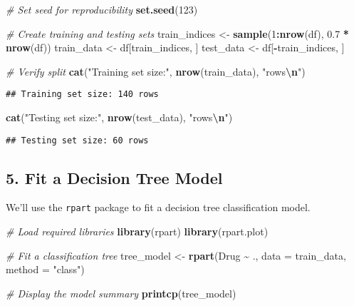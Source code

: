 \documentclass[
]{article}
\newenvironment{Shaded}{\begin{snugshade}}{\end{snugshade}}
\newcommand{\AttributeTok}[1]{\textcolor[rgb]{0.13,0.29,0.53}{#1}}
\newcommand{\CommentTok}[1]{\textcolor[rgb]{0.56,0.35,0.01}{\textit{#1}}}
\newcommand{\DecValTok}[1]{\textcolor[rgb]{0.00,0.00,0.81}{#1}}
\newcommand{\FloatTok}[1]{\textcolor[rgb]{0.00,0.00,0.81}{#1}}
\newcommand{\FunctionTok}[1]{\textcolor[rgb]{0.13,0.29,0.53}{\textbf{#1}}}
\newcommand{\NormalTok}[1]{#1}
\newcommand{\OtherTok}[1]{\textcolor[rgb]{0.56,0.35,0.01}{#1}}
\newcommand{\SpecialCharTok}[1]{\textcolor[rgb]{0.81,0.36,0.00}{\textbf{#1}}}
\newcommand{\StringTok}[1]{\textcolor[rgb]{0.31,0.60,0.02}{#1}}
\begin{document}
\begin{Shaded}
\begin{Highlighting}[]
\CommentTok{\# Set seed for reproducibility}
\FunctionTok{set.seed}\NormalTok{(}\DecValTok{123}\NormalTok{)}

\CommentTok{\# Create training and testing sets}
\NormalTok{train\_indices }\OtherTok{\textless{}{-}} \FunctionTok{sample}\NormalTok{(}\DecValTok{1}\SpecialCharTok{:}\FunctionTok{nrow}\NormalTok{(df), }\FloatTok{0.7} \SpecialCharTok{*} \FunctionTok{nrow}\NormalTok{(df))}
\NormalTok{train\_data }\OtherTok{\textless{}{-}}\NormalTok{ df[train\_indices, ]}
\NormalTok{test\_data }\OtherTok{\textless{}{-}}\NormalTok{ df[}\SpecialCharTok{{-}}\NormalTok{train\_indices, ]}

\CommentTok{\# Verify split}
\FunctionTok{cat}\NormalTok{(}\StringTok{"Training set size:"}\NormalTok{, }\FunctionTok{nrow}\NormalTok{(train\_data), }\StringTok{"rows}\SpecialCharTok{\textbackslash{}n}\StringTok{"}\NormalTok{)}
\end{Highlighting}
\end{Shaded}

\begin{verbatim}
## Training set size: 140 rows
\end{verbatim}

\begin{Shaded}
\begin{Highlighting}[]
\FunctionTok{cat}\NormalTok{(}\StringTok{"Testing set size:"}\NormalTok{, }\FunctionTok{nrow}\NormalTok{(test\_data), }\StringTok{"rows}\SpecialCharTok{\textbackslash{}n}\StringTok{"}\NormalTok{)}
\end{Highlighting}
\end{Shaded}

\begin{verbatim}
## Testing set size: 60 rows
\end{verbatim}

\subsection{5. Fit a Decision Tree
Model}\label{fit-a-decision-tree-model}

We'll use the \texttt{rpart} package to fit a decision tree
classification model.

\begin{Shaded}
\begin{Highlighting}[]
\CommentTok{\# Load required libraries}
\FunctionTok{library}\NormalTok{(rpart)}
\FunctionTok{library}\NormalTok{(rpart.plot)}

\CommentTok{\# Fit a classification tree}
\NormalTok{tree\_model }\OtherTok{\textless{}{-}} \FunctionTok{rpart}\NormalTok{(Drug }\SpecialCharTok{\textasciitilde{}}\NormalTok{ ., }\AttributeTok{data =}\NormalTok{ train\_data, }\AttributeTok{method =} \StringTok{"class"}\NormalTok{)}

\CommentTok{\# Display the model summary}
\FunctionTok{printcp}\NormalTok{(tree\_model)}
\end{Highlighting}
\end{Shaded}
\end{document}
